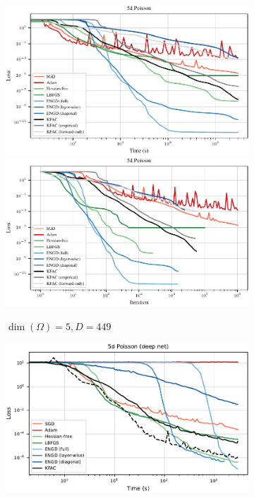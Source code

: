 \begin{figure}[!h]
  \centering
  \begin{subfigure}{0.325\linewidth}
    \includegraphics[width=\linewidth]{../kfac_pinns_exp/exp10_reproduce_poisson5d/loss_over_time}
    \\
    \includegraphics[width=\linewidth]{../kfac_pinns_exp/exp10_reproduce_poisson5d/loss_over_step}
    \caption{$\dim(\Omega) = 5, D = 449$}
  \end{subfigure}
  \hfill
  \begin{subfigure}{0.325\linewidth}
    \includegraphics[width=\linewidth]{../kfac_pinns_exp/exp12_poisson5d_deep/loss_over_time}

\end{subfigure}
\end{figure}
